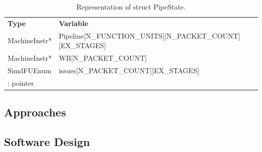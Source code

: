 \begin{table}[H]
\caption{Representation of struct PipeState.}
\begin{center}
\begin{tabular}{@{}l l@{}}
\toprule
\textbf{Type} & \textbf{Variable} \\
MachineInstr* 	& Pipeline[N\_FUNCTION\_UNITS][N\_PACKET\_COUNT][EX\_STAGES]\\
MachineInstr* 	& WB[N\_PACKET\_COUNT]\\
SimdFUEnum	& issues[N\_PACKET\_COUNT][EX\_STAGES]\\
{\small *: pointer}\\
\bottomrule%
\end{tabular}
\end{center}
\label{table:pipe_state}
\end{table}%


\subsection{Approaches}\label{sec:approaches}


\subsection{Software Design}\label{sec:explicit_impl}

